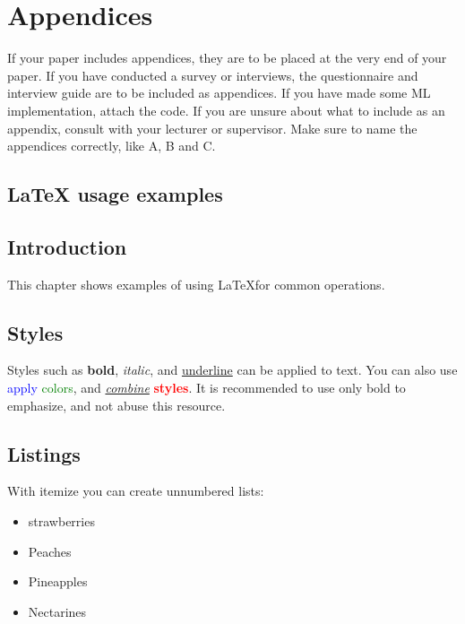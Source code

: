 \section{Appendices}
\label{chap:appendices}

If your paper includes appendices, they are to be placed at the very end of your paper. If you have conducted a survey or interviews, the questionnaire and interview guide are to be included as appendices. If you have made some ML implementation, attach the code. If you are unsure about what to include as an appendix, consult with your lecturer or supervisor. Make sure to name the appendices correctly, like A, B and C.

\subsection{LaTeX usage examples}


\subsection{Introduction}
This chapter shows examples of using \LaTeX for common operations. 

\subsection{Styles}
\label{sec:styles}
Styles such as \textbf{bold}, \textit{italic}, and \underline{underline} can be applied to text. You can also use \textcolor{red}{} \textcolor{blue}{apply} \textcolor{green}{colors}, and \underline{\textit{combine}} \textbf{\textcolor{red}{styles}}. It is recommended to use only bold to emphasize, and not abuse this resource.

\subsection{Listings}
With itemize you can create unnumbered lists:

\begin{itemize}
     \item strawberries
     \item Peaches
     \item Pineapples
     \item Nectarines
\end{itemize}

